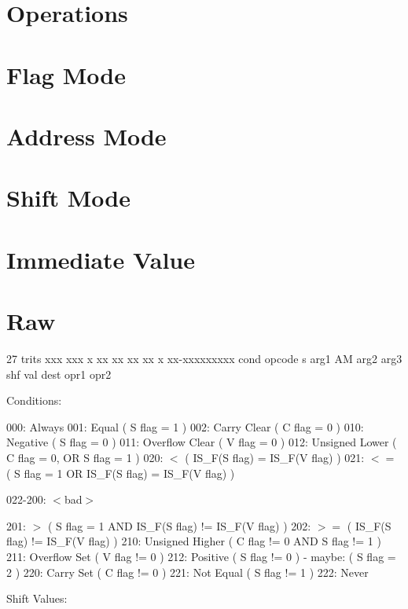 \documentclass[12pt]{article}
\begin{document}
\section{Operations} \label{sec:Operations}

\section{Flag Mode} \label{sec:Flag Mode}

\section{Address Mode} \label{sec:Address Mode}

\section{Shift Mode} \label{sec:Shift Mode}

\section{Immediate Value} \label{sec:Immediate Value}

\section{Raw} \label{sec:Raw}
    
27 trits
  xxx   xxx  x  xx  xx  xx   xx   x  xx-xxxxxxxxx
 cond opcode s arg1 AM arg2 arg3 shf  val 
               dest    opr1 opr2
    
Conditions:
    
    000:    Always
    001:    Equal ( S flag = 1 )
    002:    Carry Clear ( C flag = 0 )
    010:    Negative ( S flag = 0 )
    011:    Overflow Clear ( V flag = 0 )
    012:    Unsigned Lower ( C flag = 0, OR S flag = 1 )
    020:    $<$ ( IS\_F(S flag) = IS\_F(V flag) )    
    021:    $<=$ ( S flag = 1 OR IS\_F(S flag) = IS\_F(V flag) )
    
    022-200:   $<$bad$>$
    
    201:    $>$ ( S flag = 1 AND IS\_F(S flag) != IS\_F(V flag) )
    202:    $>=$ ( IS\_F(S flag) != IS\_F(V flag) )
    210:    Unsigned Higher ( C flag != 0 AND S flag != 1 )
    211:    Overflow Set ( V flag != 0 )
    212:    Positive ( S flag != 0 ) - maybe: ( S flag = 2 )
    220:    Carry Set ( C flag != 0 )
    221:    Not Equal ( S flag != 1 )
    222:    Never
        
Shift Values:
\end{document}
